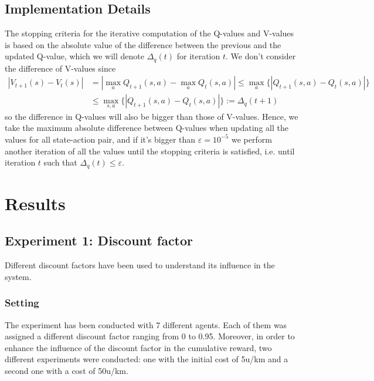 \documentclass[11pt]{article}
\begin{document}
\subsection{Implementation Details}
The stopping criteria for the iterative computation of the Q-values and V-values is based on the absolute value of the difference between the previous and the updated Q-value, which we will denote $\Delta_q(t)$ for iteration $t$. We don't consider the difference of V-values since
\begin{align*}
    |V_{t+1}(s) - V_{t}(s)| &= |\max_a Q_{t+1}(s,a) - \max_a Q_{t}(s,a) | \leq \max_a \{|Q_{t+1}(s,a) - Q_{t}(s,a)|\} \\
    &\leq \max_{s,a} \{|Q_{t+1}(s,a) - Q_{t}(s,a)|\} := \Delta_q(t+1)
\end{align*}
so the difference in Q-values will also be bigger than those of V-values. Hence, we take the maximum absolute difference between Q-values when updating all the values for all state-action pair, and if it's bigger than $\varepsilon=10^{-5}$ we perform another iteration of all the values until the stopping criteria is satisfied, i.e. until iteration $t$ such that $\Delta_q(t) \leq \varepsilon$.

\section{Results}

\subsection{Experiment 1: Discount factor}
Different discount factors have been used to understand its influence in the system. 

\subsubsection{Setting}
The experiment has been conducted with 7 different agents. Each of them was assigned a different discount factor ranging from 0 to 0.95. Moreover, in order to enhance the influence of the discount factor in the cumulative reward, two different experiments were conducted: one with the initial cost of 5u/km and a second one with a cost of 50u/km. 
\end{document}
